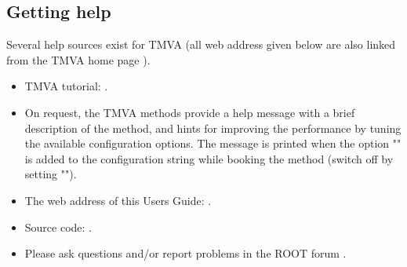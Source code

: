 \subsection{Getting help}

Several help sources exist for TMVA (all web address given below are also linked from the 
TMVA home page ).
\begin{itemize}


\item TMVA tutorial: .


\item On request, the TMVA methods provide a help message with a brief description of the 
      method, and hints for improving the performance by tuning the available configuration 
      options. The message is printed when the option "" is added to the configuration 
      string while booking the method (switch off by setting "").

\item The web address of this Users Guide:
      .


\item Source code: .


\item Please ask questions and/or report problems in the ROOT forum .

\end{itemize}

